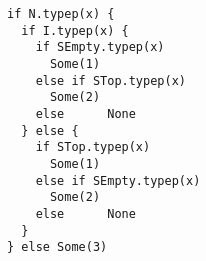 \begin{lstlisting}[style=reclojureScala]
if N.typep(x) {
  if I.typep(x) {
    if SEmpty.typep(x)
      Some(1)
    else if STop.typep(x)
      Some(2)
    else      None
  } else {
    if STop.typep(x)
      Some(1)
    else if SEmpty.typep(x)
      Some(2)
    else      None
  }
} else Some(3)
\end{lstlisting}

